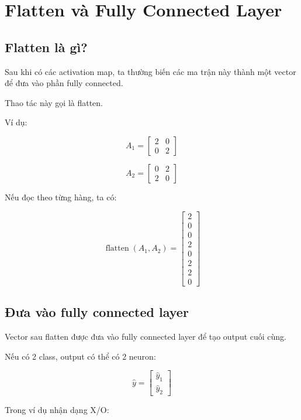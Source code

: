 \documentclass[12pt,a4paper]{report}
\begin{document}
\chapter{Flatten và Fully Connected Layer}

\section{Flatten là gì?}

Sau khi có các activation map, ta thường biến các ma trận này thành một vector để đưa vào phần fully connected.

Thao tác này gọi là flatten.

Ví dụ:

\[
    A_1 =
    \begin{bmatrix}
    2 & 0\\
    0 & 2
    \end{bmatrix}
\]

\[
    A_2 =
    \begin{bmatrix}
    0 & 2\\
    2 & 0
    \end{bmatrix}
\]

Nếu đọc theo từng hàng, ta có:

\[
    \operatorname{flatten}(A_1,A_2)
    =
    \begin{bmatrix}
    2\\0\\0\\2\\0\\2\\2\\0
    \end{bmatrix}
\]

\section{Đưa vào fully connected layer}

Vector sau flatten được đưa vào fully connected layer để tạo output cuối cùng.

Nếu có 2 class, output có thể có 2 neuron:

\[
    \hat{y}
    =
    \begin{bmatrix}
    \hat{y}_1\\
    \hat{y}_2
    \end{bmatrix}
\]

Trong ví dụ nhận dạng X/O:
\end{document}

